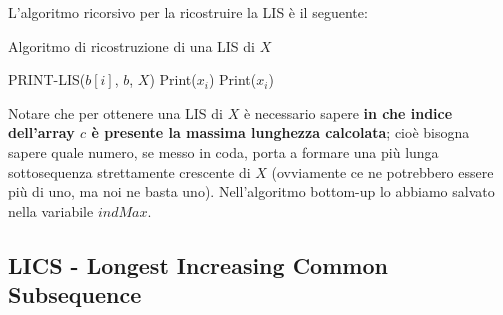 \documentclass[12pt]{article}
\begin{document}
L'algoritmo ricorsivo per la ricostruire la LIS è il seguente: \newline
\begin{algorithm}[H] 
    \caption{Algoritmo di ricostruzione di una LIS di $X$}
    \DontPrintSemicolon
     {
         {
            PRINT-LIS($b[i]$, $b$, $X$) \;
            Print($x_i$) \;
        } {
            Print($x_i$)
        }
    }
\end{algorithm} \noindent
Notare che per ottenere una LIS di $X$ è necessario sapere \textbf{in che indice dell'array $c$ è presente la massima lunghezza calcolata}; cioè bisogna
sapere quale numero, se messo in coda, porta a formare una più lunga sottosequenza strettamente crescente di $X$ (ovviamente ce ne potrebbero essere più di uno, ma noi
ne basta uno). Nell'algoritmo bottom-up lo abbiamo salvato nella variabile $indMax$.
\subsection{LICS - Longest Increasing Common Subsequence}
\end{document}
